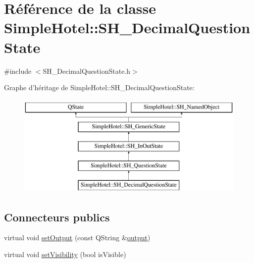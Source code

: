 \hypertarget{classSimpleHotel_1_1SH__DecimalQuestionState}{\section{Référence de la classe Simple\-Hotel\-:\-:S\-H\-\_\-\-Decimal\-Question\-State}
\label{classSimpleHotel_1_1SH__DecimalQuestionState}
}


{\ttfamily \#include $<$S\-H\-\_\-\-Decimal\-Question\-State.\-h$>$}

Graphe d'héritage de Simple\-Hotel\-:\-:S\-H\-\_\-\-Decimal\-Question\-State\-:\begin{figure}[H]
\begin{center}
\leavevmode
\includegraphics[height=5.000000cm]{classSimpleHotel_1_1SH__DecimalQuestionState}
\end{center}
\end{figure}
\subsection*{Connecteurs publics}
\begin{DoxyCompactItemize}
\item 
virtual void \hyperlink{classSimpleHotel_1_1SH__InOutState_a5e151d7b01cceb6766b6d83d4a9ac1aa}{set\-Output} (const Q\-String \&\hyperlink{classSimpleHotel_1_1SH__InOutState_a71b15e4d49b9c2aa540500065ceb39da}{output})
\item 
virtual void \hyperlink{classSimpleHotel_1_1SH__InOutState_a2da1edbe247e9b2661c81c9dc2c7ef8d}{set\-Visibility} (bool is\-Visible)
\end{DoxyCompactItemize}
